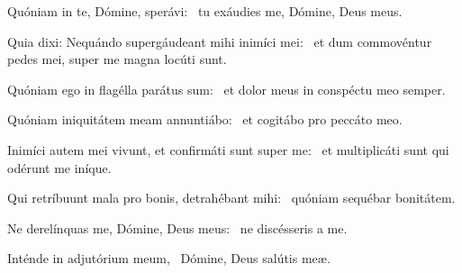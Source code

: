 \item Quóniam in te, Dómine, sperávi:~\psstar{} tu exáudies me, Dómine, Deus meus.

\item Quia dixi: Nequándo supergáudeant mihi inimíci mei:~\psstar{} et dum commovéntur pedes mei, super me magna locúti sunt.

\item Quóniam ego in flagélla parátus sum:~\psstar{} et dolor meus in conspéctu meo semper.

\item Quóniam iniquitátem meam annuntiábo:~\psstar{} et cogitábo pro peccáto meo.

\item Inimíci autem mei vivunt, et confirmáti sunt super me:~\psstar{} et multiplicáti sunt qui odérunt me iníque.

\item Qui retríbuunt mala pro bonis, detrahébant mihi:~\psstar{} quóniam sequébar bonitátem.

\item Ne derelínquas me, Dómine, Deus meus:~\psstar{} ne discésseris a me.

\item Inténde in adjutórium meum,~\psstar{} Dómine, Deus salútis meæ.

